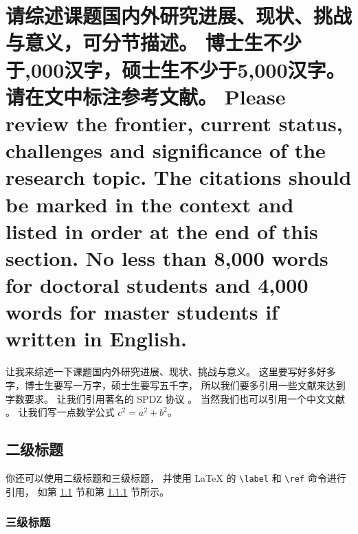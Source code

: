 \documentclass[a4paper,zihao=-4,AutoFakeBold]{ctexart}
\begin{document}
\makeatletter
{}
\makeatother




\section{请综述课题国内外研究进展、现状、挑战与意义，可分节描述。
    博士生不少于,000汉字，硕士生不少于5,000汉字。请在文中标注参考文献。 
    Please review the frontier, current status, 
    challenges and significance of the research topic. 
    The citations should be marked in the context 
    and listed in order at the end of this section. 
    No less than 8,000 words for doctoral students 
    and 4,000 words for master students if written in English.}


让我来综述一下课题国内外研究进展、现状、挑战与意义。
这里要写好多好多字，博士生要写一万字，硕士生要写五千字，
所以我们要多引用一些文献来达到字数要求。
让我们引用著名的 SPDZ 协议 \cite{SPDZ}。
当然我们也可以引用一个中文文献 \cite{ZJSD}。
让我们写一点数学公式 $c^2 = a^2 + b^2$。


\subsection{二级标题}\label{sub}

你还可以使用二级标题和三级标题，
并使用 \LaTeX{} 的 \verb|\label| 和 \verb|\ref| 命令进行引用，
如第 \ref{sub} 节和第 \ref{subsub} 节所示。



\subsubsection{三级标题}\label{subsub}
\end{document}
